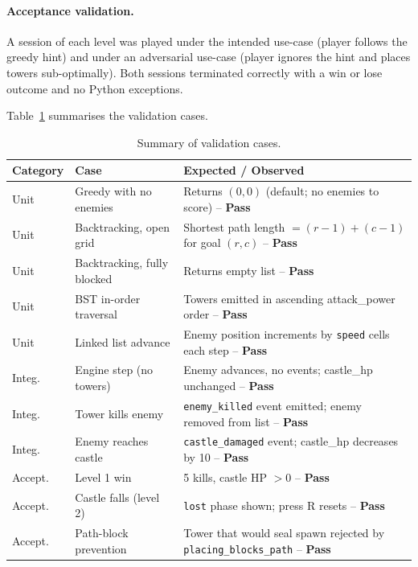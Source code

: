 \documentclass[12pt,a4paper]{report}
\begin{document}
\paragraph{Acceptance validation.}
A session of each level was played under the intended use-case (player follows
the greedy hint) and under an adversarial use-case (player ignores the hint and
places towers sub-optimally).
Both sessions terminated correctly with a win or lose outcome and no Python
exceptions.

Table~\ref{tab:tests} summarises the validation cases.

\begin{table}[ht]
\centering
\caption{Summary of validation cases.}
\label{tab:tests}
\begin{tabularx}{\linewidth}{llX}
\toprule
\textbf{Category} & \textbf{Case} & \textbf{Expected / Observed} \\
\midrule
Unit   & Greedy with no enemies    & Returns $(0,0)$ (default; no enemies to score) -- \textbf{Pass} \\
Unit   & Backtracking, open grid   & Shortest path length $= (r-1)+(c-1)$ for goal $(r,c)$ -- \textbf{Pass} \\
Unit   & Backtracking, fully blocked & Returns empty list -- \textbf{Pass} \\
Unit   & BST in-order traversal    & Towers emitted in ascending attack\_power order -- \textbf{Pass} \\
Unit   & Linked list advance       & Enemy position increments by \texttt{speed} cells each step -- \textbf{Pass} \\
Integ. & Engine step (no towers)   & Enemy advances, no events; castle\_hp unchanged -- \textbf{Pass} \\
Integ. & Tower kills enemy         & \texttt{enemy\_killed} event emitted; enemy removed from list -- \textbf{Pass} \\
Integ. & Enemy reaches castle      & \texttt{castle\_damaged} event; castle\_hp decreases by 10 -- \textbf{Pass} \\
Accept.& Level 1 win               & 5 kills, castle HP $> 0$ -- \textbf{Pass} \\
Accept.& Castle falls (level 2)    & \texttt{lost} phase shown; press R resets -- \textbf{Pass} \\
Accept.& Path-block prevention     & Tower that would seal spawn rejected by \texttt{placing\_blocks\_path} -- \textbf{Pass} \\
\bottomrule
\end{tabularx}
\end{table}
\end{document}

